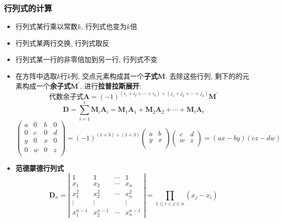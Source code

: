 \documentclass{article}
\begin{document}
			\subsubsection{行列式的计算}
				\begin{itemize}
					\item 行列式某行乘以常数$k$, 行列式也变为$k$倍
					\item 行列式某两行交换, 行列式取反
					\item 行列式某一行的非零倍加到另一行, 行列式不变
					\item 在方阵中选取$k$行$k$列, 交点元素构成其一个\textbf{子式}$\boldsymbol M$. 去除这些行列, 剩下的的元素构成一个\textbf{余子式}$\boldsymbol M^{\prime}$, 进行\textbf{拉普拉斯展开}:
					$$
					\text{代数余子式}\boldsymbol A=(-1)^{\left(i_{1}+i_{2}+\cdots+i_{k}\right)+\left(j_{1}+j_{2}+\cdots+j_{k}\right)} \boldsymbol M^{\prime}
					$$
					$$
					\boldsymbol D=\sum_{i=1}^{t}\boldsymbol M_{i} \boldsymbol A_{i}=\boldsymbol M_{1} \boldsymbol A_{1}+\boldsymbol M_{2} \boldsymbol A_{2}+\cdots+\boldsymbol M_{t} \boldsymbol A_{t}
					$$
					$$
					\left(\begin{array}{cccc}
						a & 0 & b & 0 \\
						0 & c & 0 & d \\
						y & 0 & x & 0 \\
						0 & w & 0 & z \\
					\end{array}\right)
					=(-1)^{(1+3)+(1+3)}\left(\begin{array}{cc}
						a & b \\
						y & x \\
					\end{array}\right)
					\left(\begin{array}{cc}
						c & d \\
						w & z \\
					\end{array}\right)
					=(ax-by)(cz-dw)
					$$
					\item \textbf{范德蒙德行列式}
					$$
					\boldsymbol D_{n}=\left|\begin{array}{cccc}
						1 & 1 & \cdots & 1 \\
						x_{1} & x_{2} & \cdots & x_{n} \\
						x_{1}^{2} & x_{2}^{2} & \cdots & x_{n}^{2} \\
						\vdots & \vdots & & \vdots \\
						x_{1}^{n-1} & x_{2}^{n-1} & \cdots & x_{n}^{n-1}
					\end{array}\right|=\prod_{1 \leqslant i<j \leqslant n}\left(x_{j}-x_{i}\right)
$$
\end{itemize}
\end{document}
